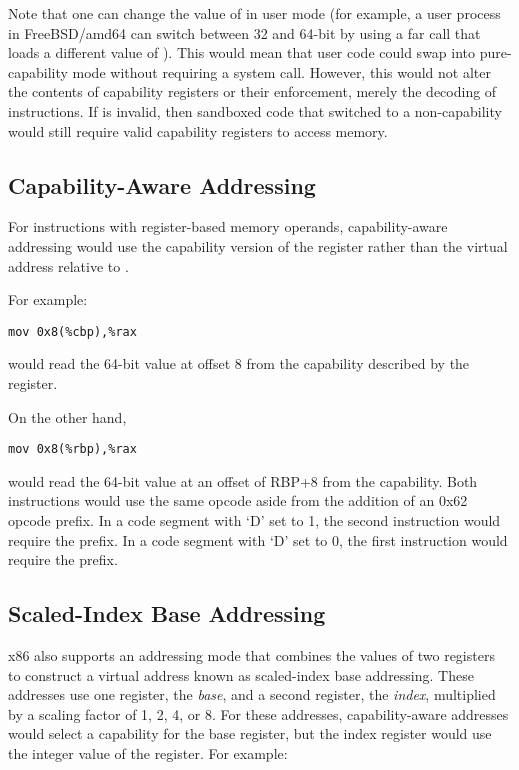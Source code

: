 Note that one can change the value of \CS{} in user mode (for example,
a user process in FreeBSD/amd64 can switch between 32 and 64-bit by
using a far call that loads a different value of \CS{}).  This would mean
that user code could swap into pure-capability mode without requiring
a system call.  However, this would not alter the contents of
capability registers or their enforcement, merely the decoding of
instructions.  If \DDC{} is invalid, then sandboxed code that switched to
a non-capability \CS{} would still require valid capability registers to
access memory.

\subsection{Capability-Aware Addressing}

For instructions with register-based memory operands, capability-aware
addressing would use the capability version of the register rather
than the virtual address relative to \DDC{}.

For example:

\begin{verbatim}
mov 0x8(%cbp),%rax
\end{verbatim}

would read the 64-bit value at offset 8 from the capability described
by the \CBP{} register.

On the other hand,

\begin{verbatim}
mov 0x8(%rbp),%rax
\end{verbatim}

would read the 64-bit value at an offset of RBP+8 from the \DDC{} capability.
Both instructions would use the same opcode aside from the addition of
an 0x62 opcode prefix.  In a code segment with `D' set to 1, the second
instruction would require the prefix.  In a code segment with `D' set to 0,
the first instruction would require the prefix.

\subsection{Scaled-Index Base Addressing}

x86 also supports an addressing mode that combines the values of two
registers to construct a virtual address known as scaled-index base
addressing.  These addresses use one register, the \emph{base}, and a
second register, the \emph{index}, multiplied by a scaling factor of 1, 2,
4, or 8.  For these addresses, capability-aware addresses would select
a capability for the base register, but the index register would use
the integer value of the register.  For example:

